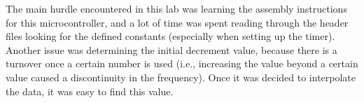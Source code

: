\documentclass{article}
\begin{document}
The main hurdle encountered in this lab was learning the assembly instructions for this microcontroller, and a lot of time was spent reading through the header files looking for the defined constants (especially when setting up the timer). Another issue was determining the initial decrement value, because there is a turnover once a certain number is used (i.e., increasing the value beyond a certain value caused a discontinuity in the frequency). Once it was decided to interpolate the data, it was easy to find this value.





%
%


%

\end{document}
